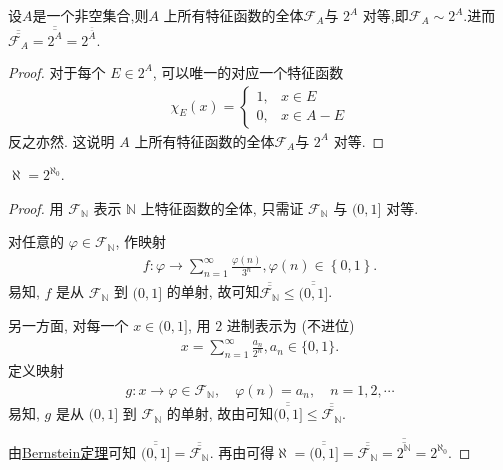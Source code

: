 \documentclass[../../main.tex]{subfiles}
\begin{document}
\begin{lemma}\label{lemma:2^A与A上所有特征函数全体对等}
设$A$是一个非空集合,则$A$ 上所有特征函数的全体$\mathcal{F}_{A}$与 $2^A$ 对等,即$\mathcal{F}_{A}\sim 2^A$.进而$\overline{\overline{\mathcal{F}_{A}}}=\overline{\overline{2^A}}=2^{\overline{\overline{A}}}.$
\end{lemma}
\begin{proof}
对于每个 $E \in 2^A$, 可以唯一的对应一个特征函数
\begin{align*}
\chi_E(x) = 
\begin{cases}
1, & x \in E\\
0, & x \in A - E
\end{cases}
\end{align*}
反之亦然. 这说明 $A$ 上所有特征函数的全体$\mathcal{F}_{A}$与 $2^A$ 对等. 
\end{proof}

\begin{theorem}\label{theorem:aleph = 2^{aleph_0}}
$\aleph = 2^{\aleph_0}$.
\end{theorem}
\begin{proof}
用 $\mathcal{F}_{\mathbb{N}}$ 表示 $\mathbb{N}$ 上特征函数的全体, 只需证 $\mathcal{F}_{\mathbb{N}}$ 与 $(0, 1]$ 对等.

对任意的 $\varphi \in \mathcal{F}_{\mathbb{N}}$, 作映射
\begin{align*}
f:\varphi \rightarrow \sum_{n=1}^{\infty}{\frac{\varphi (n)}{3^n}},\varphi \left( n \right) \in \left\{ 0,1 \right\} .
\end{align*}
易知, $f$ 是从 $\mathcal{F}_{\mathbb{N}}$ 到 $(0, 1]$ 的单射, 故可知$\overline{\overline{\mathcal{F}_{\mathbb{N}}}} \leqslant \overline{\overline{(0, 1]}}$.

另一方面, 对每一个 $x \in (0, 1]$, 用 $2$ 进制表示为 (不进位)
\begin{align*}
x = \sum_{n = 1}^{\infty} \frac{a_n}{2^n}, a_n \in \{0, 1\}.
\end{align*}
定义映射
\begin{align*}
g : x \to \varphi \in \mathcal{F}_{\mathbb{N}}, \quad \varphi(n) = a_n, \quad n = 1, 2, \cdots
\end{align*}
易知, $g$ 是从 $(0, 1]$ 到 $\mathcal{F}_{\mathbb{N}}$ 的单射, 故由可知$\overline{\overline{(0, 1]}} \leqslant \overline{\overline{\mathcal{F}_{\mathbb{N}}}}$.

由\hyperref[theorem:Bernstein定理]{Bernstein定理}可知 $\overline{\overline{(0, 1]}} = \overline{\overline{\mathcal{F}_{\mathbb{N}}}}$. 再由可得$\aleph =\overline{\overline{(0,1]}}=\overline{\overline{\mathcal{F} _{\mathbb{N}}}}=\overline{\overline{2^{\mathbb{N}}}}=2^{\aleph _0}.$
\end{proof}
\end{document}
